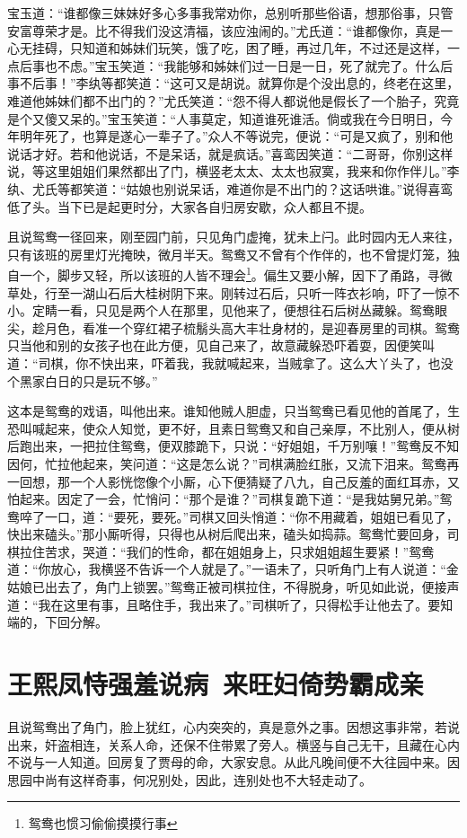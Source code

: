 \documentclass[12pt,oneside]{book}
\begin{document}
宝玉道：“谁都像三妹妹好多心多事我常劝你，总别听那些俗语，想那俗事，只管安富尊荣才是。比不得我们没这清福，该应浊闹的。”尤氏道：“谁都像你，真是一心无挂碍，只知道和姊妹们玩笑，饿了吃，困了睡，再过几年，不过还是这样，一点后事也不虑。”宝玉笑道：“我能够和姊妹们过一日是一日，死了就完了。什么后事不后事！”李纨等都笑道：“这可又是胡说。就算你是个没出息的，终老在这里，难道他姊妹们都不出门的？”尤氏笑道：“怨不得人都说他是假长了一个胎子，究竟是个又傻又呆的。”宝玉笑道：“人事莫定，知道谁死谁活。倘或我在今日明日，今年明年死了，也算是遂心一辈子了。”众人不等说完，便说：“可是又疯了，别和他说话才好。若和他说话，不是呆话，就是疯话。”喜鸾因笑道：“二哥哥，你别这样说，等这里姐姐们果然都出了门，横竖老太太、太太也寂寞，我来和你作伴儿。”李纨、尤氏等都笑道：“姑娘也别说呆话，难道你是不出门的？这话哄谁。”说得喜鸾低了头。当下已是起更时分，大家各自归房安歇，众人都且不提。

且说鸳鸯一径回来，刚至园门前，只见角门虚掩，犹未上闩。此时园内无人来往，只有该班的房里灯光掩映，微月半天。鸳鸯又不曾有个作伴的，也不曾提灯笼，独自一个，脚步又轻，所以该班的人皆不理会\footnote{鸳鸯也惯习偷偷摸摸行事}。偏生又要小解，因下了甬路，寻微草处，行至一湖山石后大桂树阴下来。刚转过石后，只听一阵衣衫响，吓了一惊不小。定睛一看，只见是两个人在那里，见他来了，便想往石后树丛藏躲。鸳鸯眼尖，趁月色，看准一个穿红裙子梳鬅头高大丰壮身材的，是迎春房里的司棋。鸳鸯只当他和别的女孩子也在此方便，见自己来了，故意藏躲恐吓着耍，因便笑叫道：“司棋，你不快出来，吓着我，我就喊起来，当贼拿了。这么大丫头了，也没个黑家白日的只是玩不够。”

这本是鸳鸯的戏语，叫他出来。谁知他贼人胆虚，只当鸳鸯已看见他的首尾了，生恐叫喊起来，使众人知觉，更不好，且素日鸳鸯又和自己亲厚，不比别人，便从树后跑出来，一把拉住鸳鸯，便双膝跪下，只说：“好姐姐，千万别嚷！”鸳鸯反不知因何，忙拉他起来，笑问道：“这是怎么说？”司棋满脸红胀，又流下泪来。鸳鸯再一回想，那一个人影恍惚像个小厮，心下便猜疑了八九，自己反羞的面红耳赤，又怕起来。因定了一会，忙悄问：“那个是谁？”司棋复跪下道：“是我姑舅兄弟。”鸳鸯啐了一口，道：“要死，要死。”司棋又回头悄道：“你不用藏着，姐姐已看见了，快出来磕头。”那小厮听得，只得也从树后爬出来，磕头如捣蒜。鸳鸯忙要回身，司棋拉住苦求，哭道：“我们的性命，都在姐姐身上，只求姐姐超生要紧！”鸳鸯道：“你放心，我横竖不告诉一个人就是了。”一语未了，只听角门上有人说道：“金姑娘已出去了，角门上锁罢。”鸳鸯正被司棋拉住，不得脱身，听见如此说，便接声道：“我在这里有事，且略住手，我出来了。”司棋听了，只得松手让他去了。要知端的，下回分解。



\chapter{王熙凤恃强羞说病~来旺妇倚势霸成亲}
且说鸳鸯出了角门，脸上犹红，心内突突的，真是意外之事。因想这事非常，若说出来，奸盗相连，关系人命，还保不住带累了旁人。横竖与自己无干，且藏在心内不说与一人知道。回房复了贾母的命，大家安息。从此凡晚间便不大往园中来。因思园中尚有这样奇事，何况别处，因此，连别处也不大轻走动了。
\end{document}
